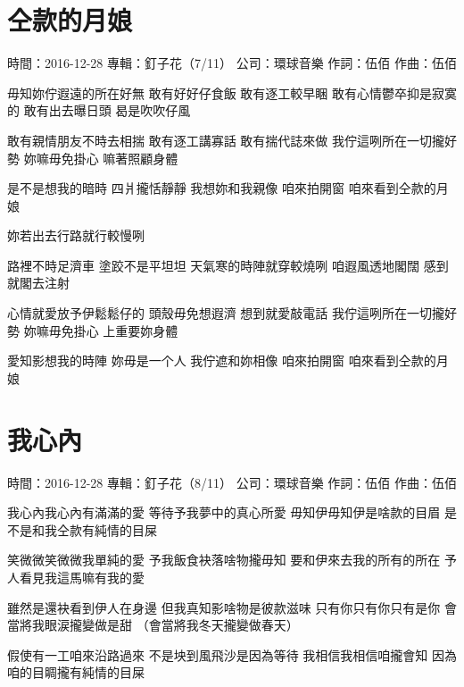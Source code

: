 \documentclass[UTF8,a4paper,oneside,twocolumn,12pt]{ctexbook}
\newcommand{\infopair}[2]{\textbullet #1：#2}
\newcommand{\zc}[1][伍佰]{\infopair{作詞}{#1}}
\newcommand{\zq}[1][伍佰]{\infopair{作曲}{#1}}
\newcommand{\zj}[1]{\infopair{專輯}{#1}}
\newcommand{\sj}[1]{\infopair{時間}{#1}}
\newcommand{\gs}[1]{\infopair{公司}{#1}}
\newenvironment{info}{\begin{flushleft}\kaishu
	}
	{\end{flushleft}\normalsize\yahei\par}
\newenvironment{lyric}{
	}
{}
\begin{document}
\section{仝款的月娘}
\begin{info}
	\sj{2016-12-28}
	\zj{釘子花（7/11）}
	\gs{環球音樂}
	\zc
	\zq
\end{info}
\begin{lyric}
	毋知妳佇遐遠的所在好無
	敢有好好仔食飯 敢有逐工較早睏
	敢有心情鬱卒抑是寂寞的
	敢有出去曝日頭 曷是吹吹仔風

	敢有親情朋友不時去相揣
	敢有逐工講寡話 敢有揣代誌來做
	我佇這咧所在一切攏好勢
	妳嘛毋免掛心 嘛著照顧身體

	是不是想我的暗時 四爿攏恬靜靜
	我想妳和我親像
	咱來拍開窗
	咱來看到仝款的月娘

	妳若出去行路就行較慢咧

	路裡不時足濟車 塗跤不是平坦坦
	天氣寒的時陣就穿較燒咧
	咱遐風透地閣闊 感到就閣去注射

	心情就愛放予伊鬆鬆仔的
	頭殼毋免想遐濟 想到就愛敲電話
	我佇這咧所在一切攏好勢
	妳嘛毋免掛心 上重要妳身體

	愛知影想我的時陣 妳毋是一个人
	我佇遮和妳相像
	咱來拍開窗
	咱來看到仝款的月娘
\end{lyric}

\section{我心內}
\begin{info}
	\sj{2016-12-28}
	\zj{釘子花（8/11）}
	\gs{環球音樂}
	\zc
	\zq
\end{info}
\begin{lyric}
	我心內我心內有滿滿的愛
	等待予我夢中的真心所愛
	毋知伊毋知伊是啥款的目眉
	是不是和我仝款有純情的目屎

	笑微微笑微微我單純的愛
	予我飯食袂落啥物攏毋知
	要和伊來去我的所有的所在
	予人看見我這馬嘛有我的愛

	雖然是還袂看到伊人在身邊
	但我真知影啥物是彼款滋味
	只有你只有你只有是你
	會當將我眼涙攏變做是甜
	（會當將我冬天攏變做春天）

	假使有一工咱來沿路過來
	不是坱到風飛沙是因為等待
	我相信我相信咱攏會知
	因為咱的目睭攏有純情的目屎
\end{lyric}
\end{document}
